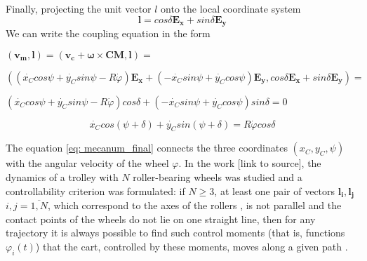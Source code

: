 \documentclass[oneside,final,14pt]{extreport}
\newcommand{\bs}{\boldsymbol}
\begin{document}
\begin{figure} [H]
\end{figure}

 Finally, projecting the unit vector $ l $ onto the local coordinate system
\begin{equation}
\bs{l}
=
cos \delta
\bs{E_{x}}
+
sin \delta
\bs{E_{y}}
\end{equation}
We can write the coupling equation in the form
\begin{flushleft}
$
(
\bs{v_{m}}
,
\bs{l}
)
=
(
\bs{v_{c}}
+
\bs{\omega}
\times
\bs{CM}
,
\bs{l}
)
=
$

$
(
(
\dot{x_{C}}
cos \psi
+
\dot{y_{C}}
sin \psi
-R \dot{\varphi}
)
\bs{E_{x}}
+
(
- \dot{x_{C}}
sin \psi
+
\dot{y_{C}}
cos \psi
)
\bs{E_{y}}
,
cos \delta
\bs{E_{x}}
+
sin \delta
\bs{E_{y}}
)
=
$

$
(
\dot{x_{C}}
cos \psi
+
\dot{y_{C}}
sin \psi
-R \dot{\varphi}
)
cos \delta
+
(
- \dot{x_{C}}
sin \psi
+
\dot{y_{C}}
cos \psi
)
sin \delta
=
0
$
\end{flushleft}
\begin{equation}
\label{eq: mecanum_final}
\dot{x_{C}}
cos (\psi + \delta)
+
\dot{y_{C}}
sin (\psi + \delta)
=
R \dot{\varphi}
cos \delta
\end{equation}

The equation \ref{eq: mecanum_final} connects the three coordinates $ (x_{C}, y_{C}, \psi) $ with the angular velocity of the wheel $ \varphi $. In the work [link to source], the dynamics of a trolley with $ N $ roller-bearing wheels was studied and a controllability criterion was formulated:
if $ N \geq 3 $, at least one pair of vectors $ \bs{l_{i}}, \bs{l_{j}} $ $ i, j = \overline{1, N} $, which correspond to the axes of the rollers , is not parallel and the contact points of the wheels do not lie on one straight line, then for any trajectory it is always possible to find such control moments (that is, functions $ \varphi_{i} (t) $) that the cart, controlled by these moments, moves along a given path .
\end{document}
